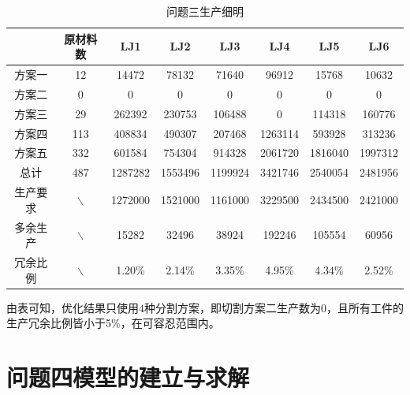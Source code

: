 \documentclass{whutmod}
\begin{document}
    \begin{table}[H]
    	\centering		
    	\caption{问题三生产细明}\label{zhuanssssasgzai}
    	\begin{tabular}{cccccccc}
    		\toprule[2pt]
    		\multicolumn{1}{m{2cm}}{\centering }
    		& \multicolumn{1}{m{2cm}}{\centering 原材料数}
    		& \multicolumn{1}{m{1cm}}{\centering LJ1}
    		& \multicolumn{1}{m{1cm}}{\centering LJ2}
    		& \multicolumn{1}{m{1cm}}{\centering LJ3}
    		& \multicolumn{1}{m{1cm}}{\centering LJ4}
    		& \multicolumn{1}{m{1cm}}{\centering LJ5}
    		& \multicolumn{1}{m{1cm}}{\centering LJ6}
    		\\
    		\midrule[1pt]
    	    方案一 & 12 &  14472     &  78132  &     71640   &    96912 &      15768    &   10632\\ 
    		方案二 & 0&  0   &  0 &      0 &     0 &     0    &       0\\ 
    		方案三 & 29& 262392   &   230753   &   106488    &       0   &   114318    &  160776\\ 
    		方案四&  113&   408834 &     490307 &     207468 &    1263114&      593928    &  313236\\ 
    		方案五 & 332 & 601584   &   754304  &    914328 &    2061720&     1816040 &    1997312\\ 
    		  总计 &487 &  1287282  &   1553496  &   1199924   &  3421746   &  2540054   &  2481956\\ 
    		生产要求 &$\backslash$ & 1272000&1521000 &1161000 & 3229500&2434500 & 2421000\\ 
    		多余生产 &$\backslash$ &  15282    &   32496   &   38924     & 192246    &  105554    &   60956\\
    		冗余比例 &$\backslash$&  1.20\%   & 2.14\% &   3.35\%   & 4.95\% &  4.34\%   & 2.52\% \\ 
    		\bottomrule[2pt]	
    	\end{tabular}
    \end{table}
   由表可知，优化结果只使用$4$种分割方案，即切割方案二生产数为$0$，且所有工件的生产冗余比例皆小于5\%，在可容忍范围内。
  	\section{问题四模型的建立与求解}
\end{document}

